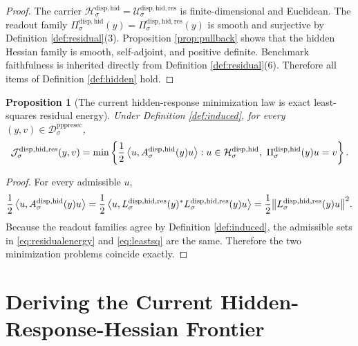\documentclass[11pt]{article}
\newcommand{\PrePreProtoSectionResidualBody}[1]{\mathcal D_{#1}^{\mathrm{pppresec}}}
\newcommand{\HiddenCarrier}[1]{\mathcal H_{#1}^{\mathrm{disp,hid}}}
\newcommand{\HiddenReadout}[1]{\Pi_{#1}^{\mathrm{disp,hid}}}
\newcommand{\HiddenHessian}[1]{A_{#1}^{\mathrm{disp,hid}}}
\newcommand{\ResidualState}[1]{\mathcal U_{#1}^{\mathrm{disp,hid,res}}}
\newcommand{\ResidualReadout}[1]{\Pi_{#1}^{\mathrm{disp,hid,res}}}
\newcommand{\ResidualOperator}[1]{L_{#1}^{\mathrm{disp,hid,res}}}
\newcommand{\ResidualLeastSquares}[1]{\mathcal J_{#1}^{\mathrm{disp,hid,res}}}
\newtheorem{proposition}{Proposition}
\begin{document}
\begin{proof}
The carrier \(\HiddenCarrier{\sigma}=\ResidualState{\sigma}\) is finite-dimensional and Euclidean. The readout family \(\HiddenReadout{\sigma}(y)=\ResidualReadout{\sigma}(y)\) is smooth and surjective by Definition \ref{def:residual}(3). Proposition \ref{prop:pullback} shows that the hidden Hessian family is smooth, self-adjoint, and positive definite. Benchmark faithfulness is inherited directly from Definition \ref{def:residual}(6). Therefore all items of Definition \ref{def:hidden} hold.
\end{proof}

\begin{proposition}[The current hidden-response minimization law is exact least-squares residual energy]
\label{prop:leastsq}
Under Definition \ref{def:induced}, for every \((y,v)\in\PrePreProtoSectionResidualBody{\sigma}\),
\begin{equation}
\ResidualLeastSquares{\sigma}(y,v)
=
\min\left\{
\frac{1}{2}\ev{u,\HiddenHessian{\sigma}(y)u}:
u\in\HiddenCarrier{\sigma},
\ \HiddenReadout{\sigma}(y)u=v
\right\}.
\label{eq:leastsq}
\end{equation}
\end{proposition}

\begin{proof}
For every admissible \(u\),
\[
\frac{1}{2}\ev{u,\HiddenHessian{\sigma}(y)u}
=
\frac{1}{2}
\ev{
u,
\ResidualOperator{\sigma}(y)^*\ResidualOperator{\sigma}(y)u
}
=
\frac{1}{2}\norm{\ResidualOperator{\sigma}(y)u}^{2}.
\]
Because the readout families agree by Definition \ref{def:induced}, the admissible sets in \eqref{eq:residualenergy} and \eqref{eq:leastsq} are the same. Therefore the two minimization problems coincide exactly.
\end{proof}

\section{Deriving the Current Hidden-Response-Hessian Frontier}
\end{document}
